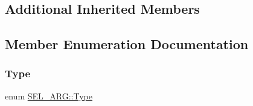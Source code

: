 \subsection*{Additional Inherited Members}


\subsection{Member Enumeration Documentation}
\mbox{\label{classSEL__ARG_ac3c2b193f810aece693ca18c6a1a9312}} 
\subsubsection{\texorpdfstring{Type}{Type}}
{\footnotesize\ttfamily enum \mbox{\hyperlink{classSEL__ARG_ac3c2b193f810aece693ca18c6a1a9312}{S\+E\+L\+\_\+\+A\+R\+G\+::\+Type}}}

